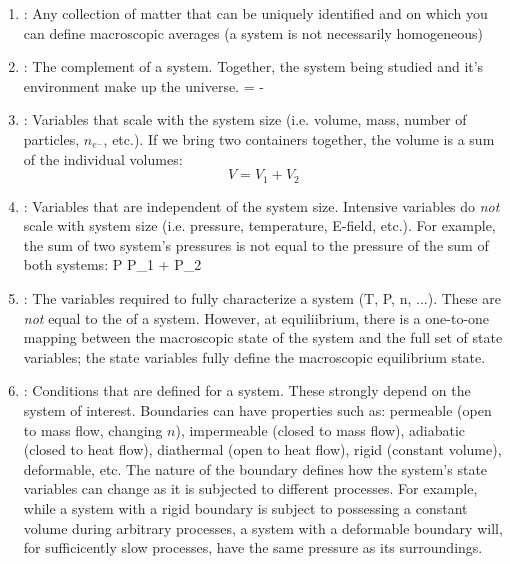 \documentclass[12pt]{article}
\begin{document}
\begin{enumerate}
\item {}: Any collection of matter that can be uniquely identified and on which you can define macroscopic averages (a system is not necessarily homogeneous)
\item {}: The complement of a system. Together, the system being studied and it's environment make up the universe. 
\eqs
\text{[environment]} = \text{[universe]} - \text{[system]}
\eqe
\item {}: Variables that scale with the system size (i.e. volume, mass, number of particles, $n_{e^-}$, etc.).  If we bring two containers together, the volume is a sum of the individual volumes:
\begin{equation}
V = V_1 + V_2
\end{equation}
\item {}: Variables that are independent of the system size. Intensive variables do \emph{not} scale with system size (i.e. pressure, temperature, E-field, etc.).  For example, the sum of two system's pressures is not equal to the pressure of the sum of both systems:
\eqs
P \neq P_1 + P_2
\eqe
\item {}: The variables required to fully characterize a system (T, P, n, ...).  These are \emph{not} equal to the  of a system. However, at equiliibrium, there is a one-to-one mapping between the macroscopic state of the system and the full set of state variables; the state variables fully define the macroscopic equilibrium state.
\item {}: Conditions that are defined for a system.  These strongly depend on the system of interest. Boundaries can have properties such as: permeable (open to mass flow, changing $n$), impermeable (closed to mass flow), adiabatic (closed to heat flow), diathermal (open to heat flow), rigid (constant volume), deformable, etc. The nature of the boundary defines how the system's state variables can change as it is subjected to different processes. For example, while a system with a rigid boundary is subject to possessing a constant volume during arbitrary processes, a system with a deformable boundary will, for sufficicently slow processes, have the same pressure as its surroundings.
\end{enumerate}
\end{document}
